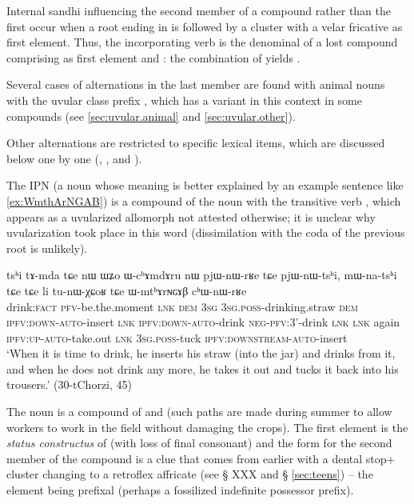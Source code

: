 Internal sandhi influencing the second member of a compound rather than the first occur when a root ending in  is followed by a cluster with a velar fricative as first element. Thus, the incorporating verb  is the denominal of a lost compound  comprising  as first element and : the combination of  yields .

Several cases of alternations in the last member are found with animal nouns with the uvular class prefix , which has a variant  in this context in some compounds (see \ref{sec:uvular.animal} and \ref{sec:uvular.other}). 

Other alternations are restricted to specific lexical items, which are discussed below one by one (, ,  and ).

The IPN  (a noun whose meaning is better explained by an example sentence like \ref{ex:WmthArNGAB}) is a compound of the noun  with the transitive verb , which appears as a uvularized allomorph  not attested otherwise; it is unclear why uvularization took place in this word (dissimilation with the coda  of the previous root is unlikely).

\begin{exe}
\ex \label{ex:WmthArNGAB}
\gll tsʰi tɤ-mda tɕe nɯ ɯʑo ɯ-cʰɤmdɤru nɯ pjɯ-nɯ-rʁe tɕe pjɯ-nɯ-tsʰi, mɯ-na-tsʰi tɕe tɕe li tu-nɯ-χɕoʁ tɕe ɯ-mtʰɤrɴɢɤβ cʰɯ-nɯ-rʁe \\
drink:\textsc{fact} \textsc{pfv}-be.the.moment \textsc{lnk} \textsc{dem} \textsc{3sg} \textsc{3sg.poss}-drinking.straw \textsc{dem} \textsc{ipfv}:\textsc{down}-\textsc{auto}-insert \textsc{lnk} \textsc{ipfv}:\textsc{down}-\textsc{auto}-drink \textsc{neg}-\textsc{pfv}:3'-drink \textsc{lnk} \textsc{lnk} again \textsc{ipfv}:\textsc{up}-\textsc{auto}-take.out \textsc{lnk} \textsc{3sg.poss}-tuck \textsc{ipfv}:\textsc{downstream}-\textsc{auto}-insert \\
\glt `When it is time to drink, he inserts his straw (into the jar) and drinks from it, and when he does not drink any more, he takes it out and tucks it back into his trousers.' (30-tChorzi, 45)
\end{exe}

The noun  is a compound of  and  (such paths are made during summer to allow workers to work in the field without damaging the crops). The first element  is the \textit{status constructus} of  (with loss of final consonant) and the form  for the second member of the compound is a clue that  comes from earlier  with a dental stop+ cluster changing to a retroflex affricate (see § XXX and § \ref{sec:teens}) -- the  element being prefixal (perhaps a fossilized indefinite possessor prefix).

